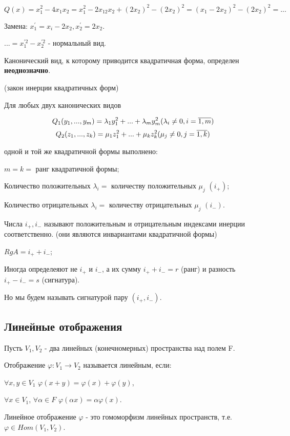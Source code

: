 \documentclass[../main.tex]{subfiles}
\begin{document}
\void{} $Q(x) = x^2_1 - 4x_1x_2 = x^2_1 - 2x_12x_2 + (2x_2)^2-(2x_2)^2 =
(x_1-2x_2)^2 - (2x_2)^2 = ...$

Замена: $x^{'}_1 = x_i - 2x_2, x^{'}_2 = 2x_2$.

$... = x^{'2}_1 - x^{'2}_2$ - нормальный вид.

\void{} Канонический вид, к которому приводится квадратичная форма, определен
\textbf{неоднозначно}.

\void{} (закон инерции квадратичных форм)

Для любых двух канонических видов

$$ Q_1(y_1,...,y_m) = \lambda_1y_1^2 + ... + \lambda_m y^2_m  (\lambda_i\neq 0, i = \overline{1, m})$$
$$ Q_2(z_1,...,z_k) = \mu_1z_1^2 + ... + \mu_k z^2_k  (\mu_j\neq 0, j = \overline{1, k})$$

одной и той же квадратичной формы выполнено:

\void{} $m = k =$ ранг квадратичной формы;

\void{} Количество положительных $\lambda_i =$ количеству положительных $\mu_j$ $(i_{+})$;

\void{} Количество отрицательных $\lambda_i =$ количеству отрицательных $\mu_j$ $(i_{-})$.

\void Числа $i_{+}, i_{-}$ называют положительным и отрицательным индексами инерции соответственно.
(они являются инвариантами квадратичной формы)

\void{} $RgA = i_{+} + i_{-}$;

\void{} Иногда определеяют не $i_{+}$ и $i_{-}$, а их сумму
$i_{+} + i_{-} = r$ (ранг) и разность $i_{+} - i_{-} = s$ (сигнатура).

Но мы будем называть сигнатурой пару $(i_{+}, i_{-})$.

\subsection{Линейные отображения}
Пусть $V_1, V_2$ - два линейных (конечномерных) пространства над полем F.

\void{} Отображение $\varphi: V_1\rightarrow V_2$ называется линейным, если:

 $\forall x,y\in V_1$ $\varphi(x+y) = \varphi(x) + \varphi(y)$,

 $\forall x\in V_1$, $\forall\alpha\in F$ $\varphi(\alpha x) = \alpha\varphi(x)$.

\void{} Линейное отображение $\varphi$ - это гомоморфизм линейных пространств, т.е. $\varphi\in Hom(V_1,V_2)$.
\end{document}
